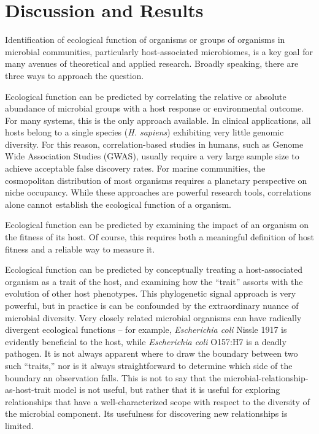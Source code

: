 \section{Discussion and Results}

Identification of ecological function of organisms or groups of organisms in microbial communities, particularly host-associated microbiomes, is a key goal for many avenues of theoretical and applied research. Broadly speaking, there are three ways to approach the question.

Ecological function can be predicted by correlating the relative or absolute abundance of microbial groups with a host response or environmental outcome. For many systems, this is the only approach available. In clinical applications, all hosts belong to a single species ({\em H. sapiens}) exhibiting very little genomic diversity. For this reason, correlation-based studies in humans, such as Genome Wide Association Studies (GWAS), usually require a very large sample size to achieve acceptable false discovery rates. \cite{pearson2008interpret} For marine communities, the cosmopolitan distribution of most organisms requires a planetary perspective on niche occupancy. \cite{jiang2012functional,violle2014emergence} While these approaches are powerful research tools, correlations alone cannot establish the ecological function of a organism.

Ecological function can be predicted by examining the impact of an organism on the fitness of its host. Of course, this requires both a meaningful definition of host fitness and a reliable way to measure it. \cite{kutzer2016maximising,rynkiewicz2015ecosystem}

Ecological function can be predicted by conceptually treating a host-associated organism as a trait of the host, and examining how the ``trait'' assorts with the evolution of other host phenotypes. \cite{easson2014phylogenetic,schottner2013relationships} This phylogenetic signal approach \cite{felsenstein1985phylogenies,revell2008phylogenetic,munkemuller2012measure} is very powerful, but in practice is can be confounded by the extraordinary nuance of microbial diversity. Very closely related microbial organisms can have radically divergent ecological functions -- for example, {\em Escherichia coli} Nissle 1917 is evidently beneficial to the host, \cite{gronbach2010safety} while {\em Escherichia coli} O157:H7 is a deadly pathogen. \cite{gally2017microbe} It is not always apparent where to draw the boundary between two such ``traits,'' nor is it always straightforward to determine which side of the boundary an observation falls. This is not to say that the microbial-relationship-as-host-trait model is not useful, but rather that it is useful for exploring relationships that have a well-characterized scope with respect to the diversity of the microbial component. Its usefulness for discovering new relationships is limited.

